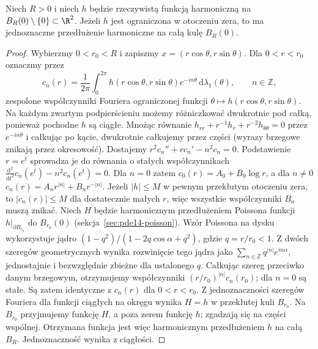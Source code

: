 \begin{lemat}
\label{lem:pde-v5-removable-bounded-2d}
Niech $R>0$ i niech $h$ będzie rzeczywistą funkcją harmoniczną
na $B_R(0)\setminus\{0\}\subset\R^2$. Jeżeli $h$ jest ograniczona
w otoczeniu zera, to ma jednoznaczne przedłużenie harmoniczne
na całą kulę $B_R(0)$.
\end{lemat}
\begin{proof}
Wybierzmy $0<r_0<R$ i zapiszmy $x=(r\cos\theta,r\sin\theta)$.
Dla $0<r<r_0$ oznaczmy przez
\[
 c_n(r)=\frac1{2\pi}\int_{0}^{2\pi}
 h(r\cos\theta,r\sin\theta)e^{-in\theta}
 \,\mathrm d\lambda_1(\theta),\qquad n\in\mathbb Z,
\]
zespolone współczynniki Fouriera ograniczonej funkcji
$\theta\mapsto h(r\cos\theta,r\sin\theta)$.
Na każdym zwartym podpierścieniu możemy różniczkować
dwukrotnie pod całką, ponieważ pochodne $h$ są ciągłe.
Mnożąc równanie
$h_{rr}+r^{-1}h_r+r^{-2}h_{\theta\theta}=0$
przez $e^{-in\theta}$ i całkując po kącie,
dwukrotnie całkujemy przez części (wyrazy brzegowe
znikają przez okresowość). Dostajemy
$r^2c_n''+rc_n'-n^2c_n=0$. Podstawienie $r=e^t$
sprowadza je do równania o stałych współczynnikach
$\frac{\mathrm d^2}{\mathrm dt^2}c_n(e^t)-n^2c_n(e^t)=0$. Dla $n=0$ zatem
$c_0(r)=A_0+B_0\log r$, a dla $n\ne0$
$c_n(r)=A_nr^{|n|}+B_nr^{-|n|}$.
Jeżeli $|h|\le M$ w pewnym przekłutym otoczeniu zera,
to $|c_n(r)|\le M$ dla dostatecznie małych $r$, więc wszystkie współczynniki
$B_n$ muszą znikać. Niech $H$ będzie harmonicznym
przedłużeniem Poissona funkcji $h|_{\partial B_{r_0}}$
do $B_{r_0}(0)$ (sekcja~\ref{sec:pde14-poisson}).
Wzór Poissona na dysku wykorzystuje jądro
$(1-q^2)/(1-2q\cos\alpha+q^2)$, gdzie $q=r/r_0<1$.
Z dwóch szeregów geometrycznych wynika rozwinięcie
tego jądra jako $\sum_{n\in\mathbb Z}q^{|n|}e^{in\alpha}$,
jednostajnie i bezwzględnie zbieżne dla ustalonego $q$.
Całkując szereg przeciwko danym brzegowym, otrzymujemy
współczynniki $(r/r_0)^{|n|}c_n(r_0)$; dla $n=0$
są stałe.
Są zatem identyczne z $c_n(r)$ dla $0<r<r_0$.
Z jednoznaczności szeregów Fouriera dla funkcji ciągłych
na okręgu wynika $H=h$ w przekłutej kuli $B_{r_0}$.
Na $B_{r_0}$ przyjmujemy funkcję $H$, a poza zerem
funkcję $h$; zgadzają się na części wspólnej. Otrzymana
funkcja jest więc harmonicznym przedłużeniem $h$ na całą
$B_R$.
Jednoznaczność wynika z ciągłości.
\end{proof}

